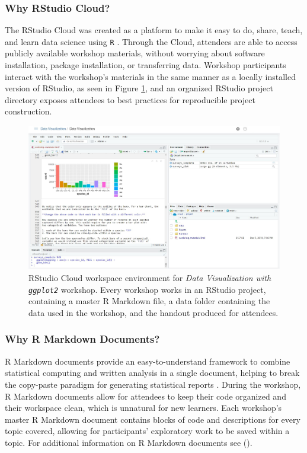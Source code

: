 \documentclass[12pt]{article}
\begin{document}
\subsubsection{Why RStudio Cloud?} 

\quad The RStudio Cloud was created as a platform to make it easy to do, share,
teach, and learn data science using \texttt{R} \citep{RStudioCloud}. Through the 
Cloud, attendees are able to access publicly available workshop materials, 
without worrying about software installation, package installation, or
transferring data. Workshop participants interact with the workshop's materials
in the same manner as a locally installed version of RStudio, as seen in Figure
\ref{fig:cloud}, and an organized RStudio project directory exposes attendees to 
best practices for reproducible project construction. 

\begin{figure}[t!]
    \centering
    \includegraphics[width = \textwidth]{images/RStudio_Cloud_blind.png}
    \caption{RStudio Cloud workspace environment for \emph{Data Visualization
    with \texttt{ggplot2}} workshop. Every workshop works in an RStudio project,
    containing a master R Markdown file, a data folder containing the
    data used in the workshop, and the handout produced for attendees.} 
    \label{fig:cloud}
\end{figure}

\subsubsection{Why R Markdown Documents?}

\quad R Markdown documents provide an easy-to-understand framework to combine
statistical computing and written analysis in a single document, helping to
break the copy-paste paradigm for generating statistical reports 
\citep{mine-rmarkdown}. During the workshop, R Markdown documents allow for 
attendees to keep their code organized and their workspace clean, which is
unnatural for new learners. Each workshop's master R Markdown document contains
blocks of code and descriptions for every topic covered, allowing for
participants' exploratory work to be saved within a topic. For additional
information on R Markdown documents see \citeauthor{mine-rmarkdown} 
(\citeyear{mine-rmarkdown}). 
\end{document}
